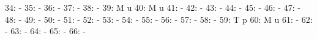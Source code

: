 \documentclass[nojss]{jss}
\begin{document}
\begin{Schunk}
\begin{Soutput}
 34:                                                                          -
 35:                                                                          -
 36:                                                                          -
 37:                                                                          -
 38:                                                                          -
 39:                                          M                               u
 40:                                          M                               u
 41:                                                                          -
 42:                                                                          -
 43:                                                                          -
 44:                                                                          -
 45:                                                                          -
 46:                                                                          -
 47:                                                                          -
 48:                                                                          -
 49:                                                                          -
 50:                                                                          -
 51:                                                                          -
 52:                                                                          -
 53:                                                                          -
 54:                                                                          -
 55:                                                                          -
 56:                                                                          -
 57:                                                                          -
 58:                                                                          -
 59:                                          T                               p
 60:                                          M                               u
 61:                                                                          -
 62:                                                                          -
 63:                                                                          -
 64:                                                                          -
 65:                                                                          -
 66:                                                                          -

\end{Soutput}
\end{Schunk}
\end{document}
